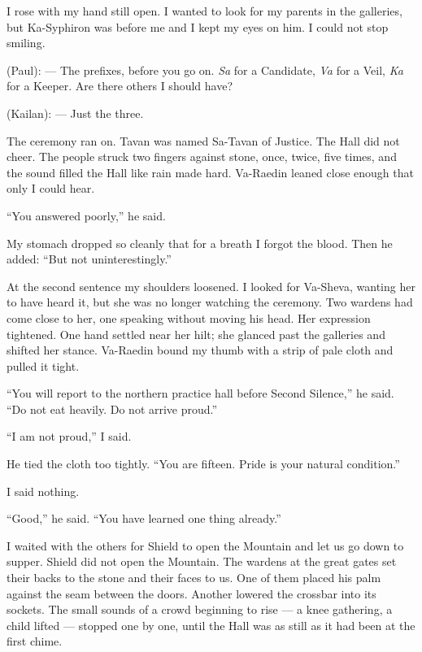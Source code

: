 I rose with my hand still open. I wanted to look for my parents in the galleries, but Ka-Syphiron was before me and I kept my eyes on him. I could not stop smiling.\par

\begin{room}

(Paul): --- The prefixes, before you go on. \textit{Sa } for a Candidate, \textit{Va } for a Veil, \textit{Ka } for a Keeper. Are there others I should have?

(Kailan): --- Just the three.

\end{room}

The ceremony ran on. Tavan was named Sa-Tavan of Justice. The Hall did not cheer. The people struck two fingers against stone, once, twice, five times, and the sound filled the Hall like rain made hard. Va-Raedin leaned close enough that only I could hear.\par

``You answered poorly,'' he said.\par

My stomach dropped so cleanly that for a breath I forgot the blood. Then he added: ``But not uninterestingly.''\par

At the second sentence my shoulders loosened. I looked for Va-Sheva, wanting her to have heard it, but she was no longer watching the ceremony. Two wardens had come close to her, one speaking without moving his head. Her expression tightened. One hand settled near her hilt; she glanced past the galleries and shifted her stance. Va-Raedin bound my thumb with a strip of pale cloth and pulled it tight.\par

``You will report to the northern practice hall before Second Silence,'' he said. ``Do not eat heavily. Do not arrive proud.''\par

``I am not proud,'' I said.\par

He tied the cloth too tightly. ``You are fifteen. Pride is your natural condition.'' \par

I said nothing.\par

``Good,'' he said. ``You have learned one thing already.''\par

I waited with the others for Shield to open the Mountain and let us go down to supper. Shield did not open the Mountain. The wardens at the great gates set their backs to the stone and their faces to us. One of them placed his palm against the seam between the doors. Another lowered the crossbar into its sockets. The small sounds of a crowd beginning to rise --- a knee gathering, a child lifted --- stopped one by one, until the Hall was as still as it had been at the first chime.\par

